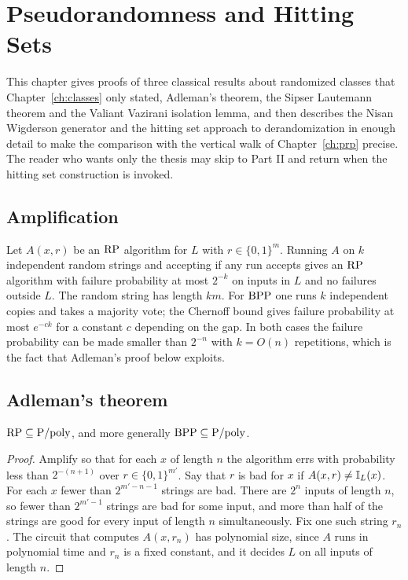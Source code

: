 \chapter{Pseudorandomness and Hitting Sets}
\label{ch:pseudo}

This chapter gives proofs of three classical results about randomized classes that Chapter~\ref{ch:classes} only stated, Adleman's theorem, the Sipser Lautemann theorem and the Valiant Vazirani isolation lemma, and then describes the Nisan Wigderson generator and the hitting set approach to derandomization in enough detail to make the comparison with the vertical walk of Chapter~\ref{ch:prp} precise. The reader who wants only the thesis may skip to Part II and return when the hitting set construction is invoked.

\section{Amplification}

Let $A(x, r)$ be an $\mathrm{RP}$ algorithm for $L$ with $r \in \{0,1\}^m$. Running $A$ on $k$ independent random strings and accepting if any run accepts gives an $\mathrm{RP}$ algorithm with failure probability at most $2^{-k}$ on inputs in $L$ and no failures outside $L$. The random string has length $km$. For $\mathrm{BPP}$ one runs $k$ independent copies and takes a majority vote; the Chernoff bound gives failure probability at most $e^{-ck}$ for a constant $c$ depending on the gap. In both cases the failure probability can be made smaller than $2^{-n}$ with $k = O(n)$ repetitions, which is the fact that Adleman's proof below exploits.

\section{Adleman's theorem}

\begin{theorem}
$\mathrm{RP} \subseteq \mathrm{P}/\mathrm{poly}$, and more generally $\mathrm{BPP} \subseteq \mathrm{P}/\mathrm{poly}$.
\end{theorem}

\begin{proof}
Amplify so that for each $x$ of length $n$ the algorithm errs with probability less than $2^{-(n+1)}$ over $r \in \{0,1\}^{m'}$. Say that $r$ is bad for $x$ if $A(x, r) \neq \mathbb{I}_L(x)$. For each $x$ fewer than $2^{m' - n - 1}$ strings are bad. There are $2^n$ inputs of length $n$, so fewer than $2^{m' - 1}$ strings are bad for some input, and more than half of the strings are good for every input of length $n$ simultaneously. Fix one such string $r_n$. The circuit that computes $A(x, r_n)$ has polynomial size, since $A$ runs in polynomial time and $r_n$ is a fixed constant, and it decides $L$ on all inputs of length $n$.
\end{proof}

